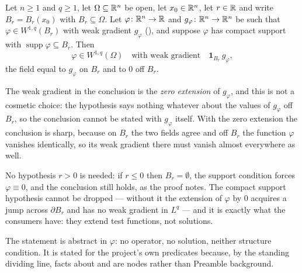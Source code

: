 \begin{lemma}
Let $n\ge1$ and $q\ge1$, let $\Omega\subseteq\mathbb{R}^n$ be open, let
$x_0\in\mathbb{R}^n$, let $r\in\mathbb{R}$ and write $B_r=B_r(x_0)$ with
$B_r\subseteq\Omega$.  Let $\varphi\colon\mathbb{R}^n\to\mathbb{R}$ and
$g_\varphi\colon\mathbb{R}^n\to\mathbb{R}^n$ be such that
$\varphi\in W^{1,q}(B_r)$ with weak gradient $g_\varphi$
(), and suppose $\varphi$ has compact support with
$\operatorname{supp}\varphi\subseteq B_r$.  Then
\[
\varphi\in W^{1,q}(\Omega)\quad\text{with weak gradient}\quad
\mathbf1_{B_r}\,g_\varphi ,
\]
the field equal to $g_\varphi$ on $B_r$ and to $0$ off $B_r$.

The weak gradient in the conclusion is the \emph{zero extension} of
$g_\varphi$, and this is not a cosmetic choice: the hypothesis says nothing
whatever about the values of $g_\varphi$ off $B_r$, so the conclusion cannot be
stated with $g_\varphi$ itself.  With the zero extension the conclusion is
sharp, because on $B_r$ the two fields agree and off $B_r$ the function
$\varphi$ vanishes identically, so its weak gradient there must vanish almost
everywhere as well.

No hypothesis $r>0$ is needed: if $r\le0$ then $B_r=\emptyset$, the support
condition forces $\varphi\equiv0$, and the conclusion still holds, as the proof
notes.  The compact support hypothesis cannot be dropped --- without it the
extension of $\varphi$ by $0$ acquires a jump across $\partial B_r$ and has no
weak gradient in $L^q$ --- and it is exactly what the consumers have: they
extend test functions, not solutions.

The statement is abstract in $\varphi$: no operator, no solution, neither
structure condition.  It is stated for the project's own predicates because,
by the standing dividing line, facts about  and
 are nodes rather than Preamble background.
\end{lemma}
